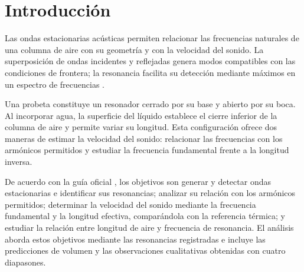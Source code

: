 \section{Introducción}
Las ondas estacionarias acústicas permiten relacionar las frecuencias naturales de una columna de aire con su geometría y con la velocidad del sonido. La superposición de ondas incidentes y reflejadas genera modos compatibles con las condiciones de frontera; la resonancia facilita su detección mediante máximos en un espectro de frecuencias \cite{halliday2018,openstax2016}.

Una probeta constituye un resonador cerrado por su base y abierto por su boca. Al incorporar agua, la superficie del líquido establece el cierre inferior de la columna de aire y permite variar su longitud. Esta configuración ofrece dos maneras de estimar la velocidad del sonido: relacionar las frecuencias con los armónicos permitidos y estudiar la frecuencia fundamental frente a la longitud inversa.

De acuerdo con la guía oficial \cite{guiauca}, los objetivos son generar y detectar ondas estacionarias e identificar sus resonancias; analizar su relación con los armónicos permitidos; determinar la velocidad del sonido mediante la frecuencia fundamental y la longitud efectiva, comparándola con la referencia térmica; y estudiar la relación entre longitud de aire y frecuencia de resonancia. El análisis aborda estos objetivos mediante las resonancias registradas e incluye las predicciones de volumen y las observaciones cualitativas obtenidas con cuatro diapasones.
